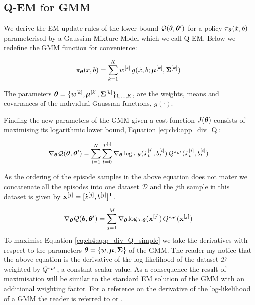 \begin{appendices}
\section{Q-EM for GMM}\label{app:grad}

We derive the EM update rules of the lower bound $\mathcal{Q}(\boldsymbol{\theta},\boldsymbol{\theta}')$ 
for a policy $\pi_{\boldsymbol{\theta}}(\dot{x},b)$ parameterised by a Gaussian Mixture Model which we call 
Q-EM. Below we redefine the GMM function for convenience:

\begin{equation} \label{eq:ch5:app:gmm}
  \pi_{\boldsymbol{\theta}}(\dot{x},b) = \sum\limits_{k=1}^K  w^{[k]}\,g(\dot{x},b;\boldsymbol{\mu}^{[k]},\boldsymbol{\Sigma}^{[k]})
\end{equation}

The parameters $\boldsymbol{\theta} = \{w^{[k]},\boldsymbol{\mu}^{[k]},\boldsymbol{\Sigma}^{[k]}\}_{1,\dots,K}$, are the weights, means and covariances 
of the individual Gaussian functions, $g(\cdot)$. 

Finding the new parameters of the GMM given a cost function $J(\boldsymbol{\theta})$ consists of maximising its logarithmic 
lower bound, Equation \ref{eq:ch4:app_div_Q}:

\begin{equation}\label{eq:ch4:app_div_Q}
  \nabla_{\boldsymbol{\theta}}\mathcal{Q}(\boldsymbol{\theta},\boldsymbol{\theta}') = \sum\limits_{i=1}^{N} \sum\limits_{t=0}^{T^{[i]}} \nabla_{\boldsymbol{\theta}}\log \pi_{\boldsymbol{\theta}}(\dot{x}^{[i]}_t,b^{[i]}_t) \, Q^{\pi_{\boldsymbol{\theta}'}}(\dot{x}^{[i]}_t,b^{[i]}_t)
\end{equation}

As the ordering of the episode samples in the above equation does not mater we concatenate all the episodes into one dataset $\mathcal{D}$ 
and the $j$th sample in this dataset is given by $\mathbf{x}^{[j]} = [\dot{x}^{[j]},b^{[j]}]^{\mathrm{T}}$. 

\begin{equation}\label{eq:ch4:app_div_Q_simple}
   \nabla_{\boldsymbol{\theta}}\mathcal{Q}(\boldsymbol{\theta},\boldsymbol{\theta}') = \sum\limits_{j=1}^{M} \nabla_{\boldsymbol{\theta}}\log \pi_{\boldsymbol{\theta}}(\mathbf{x}^{[j]}) \, Q^{\pi_{\boldsymbol{\theta}'}}(\mathbf{x}^{[j]})
\end{equation}
To maximise Equation \ref{eq:ch4:app_div_Q_simple} we take the derivatives with respect to the 
parameters $\boldsymbol{\theta}=\{w,\boldsymbol{\mu},\boldsymbol{\Sigma}\}$ of the GMM.  The reader my notice 
that the above equation is the derivative of the log-likelihood of the dataset $\mathcal{D}$ weighted
by $Q^{\pi_{\boldsymbol{\theta}'}}$, a constant scalar value. As a consequence the result of maximisation will 
be similar to the standard EM solution of the GMM with an additional weighting factor. For a 
reference on the derivative of the log-likelihood of a GMM the reader is referred to \cite[p. 49]{matrix_ckb}
or \cite[Chap. 9]{Bishop_2006}.


\end{appendices}
